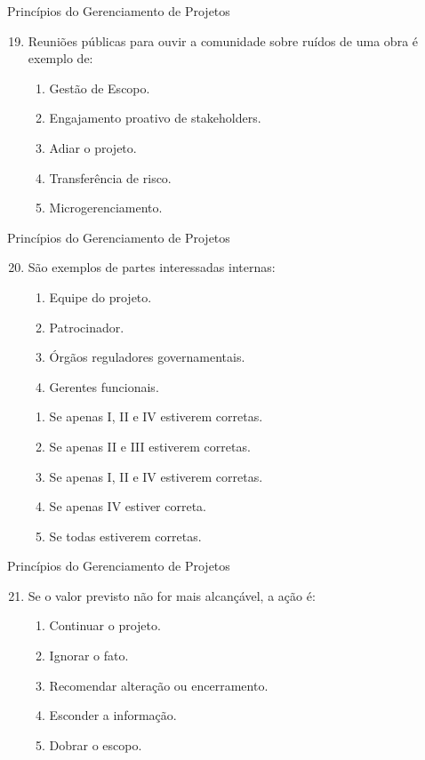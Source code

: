 \documentclass{beamer}
\begin{document}
\begin{frame}{Princípios do Gerenciamento de Projetos}
	\begin{enumerate}
		\setcounter{enumi}{18}
		\justifying
		\item Reuniões públicas para ouvir a comunidade sobre ruídos de uma obra é exemplo de:
		\begin{enumerate}[a]
			\item Gestão de Escopo.
			\item \alert<2>{Engajamento proativo de stakeholders.}
			\item Adiar o projeto.
			\item Transferência de risco.
			\item Microgerenciamento.
		\end{enumerate}
	\end{enumerate}
\end{frame}

\begin{frame}{Princípios do Gerenciamento de Projetos}
	\begin{enumerate}
		\setcounter{enumi}{19}
		\justifying
		\item São exemplos de partes interessadas internas:
		\begin{enumerate}[I]
			\item Equipe do projeto.
			\item Patrocinador.
			\item Órgãos reguladores governamentais.
			\item Gerentes funcionais.
		\end{enumerate}
		\begin{enumerate}[a]
			\item Se apenas I, II e IV estiverem corretas.
			\item Se apenas II e III estiverem corretas.
			\item \alert<2>{Se apenas I, II e IV estiverem corretas.}
			\item Se apenas IV estiver correta.
			\item Se todas estiverem corretas.
		\end{enumerate}
	\end{enumerate}
\end{frame}

\begin{frame}{Princípios do Gerenciamento de Projetos}
	\begin{enumerate}
		\setcounter{enumi}{20}
		\justifying
		\item Se o valor previsto não for mais alcançável, a ação é:
		\begin{enumerate}[a]
			\item Continuar o projeto.
			\item Ignorar o fato.
			\item \alert<2>{Recomendar alteração ou encerramento.}
			\item Esconder a informação.
			\item Dobrar o escopo.
		\end{enumerate}
	\end{enumerate}
\end{frame}
\end{document}

